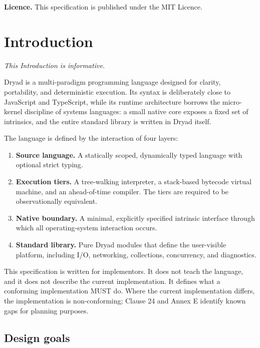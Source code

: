 \documentclass[
  english,
  11pt,
  a4paper,
]{article}
\providecommand{\tightlist}{%
  \setlength{\itemsep}{0pt}\setlength{\parskip}{0pt}}
\begin{document}
\textbf{Licence.} This specification is published under the MIT Licence.

\section{Introduction}\label{introduction}

\emph{This Introduction is informative.}

Dryad is a multi-paradigm programming language designed for clarity,
portability, and deterministic execution. Its syntax is deliberately
close to JavaScript and TypeScript, while its runtime architecture
borrows the micro-kernel discipline of systems languages: a small native
core exposes a fixed set of intrinsics, and the entire standard library
is written in Dryad itself.

The language is defined by the interaction of four layers:

\begin{enumerate}
\def\labelenumi{\arabic{enumi}.}
\tightlist
\item
  \textbf{Source language.} A statically scoped, dynamically typed
  language with optional strict typing.
\item
  \textbf{Execution tiers.} A tree-walking interpreter, a stack-based
  bytecode virtual machine, and an ahead-of-time compiler. The tiers are
  required to be observationally equivalent.
\item
  \textbf{Native boundary.} A minimal, explicitly specified intrinsic
  interface through which all operating-system interaction occurs.
\item
  \textbf{Standard library.} Pure Dryad modules that define the
  user-visible platform, including I/O, networking, collections,
  concurrency, and diagnostics.
\end{enumerate}

This specification is written for implementors. It does not teach the
language, and it does not describe the current implementation. It
defines what a conforming implementation MUST do. Where the current
implementation differs, the implementation is non-conforming; Clause 24
and Annex E identify known gaps for planning purposes.

\subsection{Design goals}\label{design-goals}
\end{document}

